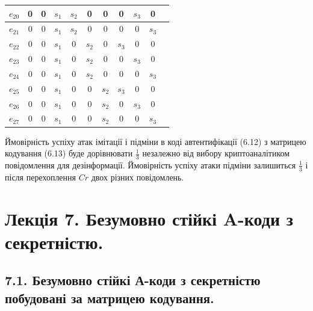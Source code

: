 \begin{example}
\begin{center}
\begin{tabular}{|c|c|c|c|c|c|c|c|c|c|c|}
            $e_{20}$ & 0 & 0 & $s_1$ & $s_2$ & 0 & 0 & 0 & $s_3$ & 0 \\\hline
            $e_{21}$ & 0 & 0 & $s_1$ & $s_2$ & 0 & 0 & 0 & 0 & $s_3$ \\\hline
            $e_{22}$ & 0 & 0 & $s_1$ & 0 & $s_2$ & 0 & $s_3$ & 0 & 0 \\\hline
            $e_{23}$ & 0 & 0 & $s_1$ & 0 & $s_2$ & 0 & 0 & $s_3$ & 0 \\\hline
            $e_{24}$ & 0 & 0 & $s_1$ & 0 & $s_2$ & 0 & 0 & 0 & $s_3$ \\\hline
            $e_{25}$ & 0 & 0 & $s_1$ & 0 & 0 & $s_2$ & $s_3$ & 0 & 0 \\\hline
            $e_{26}$ & 0 & 0 & $s_1$ & 0 & 0 & $s_2$ & 0 & $s_3$ & 0 \\\hline
            $e_{27}$ & 0 & 0 & $s_1$ & 0 & 0 & $s_2$ & 0 & 0 & $s_3$ \\\hline
        \end{tabular}
    \end{center}
    
    Ймовірність успіху атак імітації і підміни в коді автентифікації (6.12) з
    матрицею кодування (6.13) буде дорівнювати $\frac{1}{3}$ незалежно від вибору
    криптоаналітиком повідомлення для дезінформації.
    Ймовірність успіху атаки підміни залишиться $\frac{1}{3}$ і після перехоплення $Cr$
    двох різних повідомлень.
\end{example}


\section{Лекція 7. Безумовно стійкі A-коди з секретністю.}

\subsection{7.1. Безумовно стійкі А-коди з секретністю побудовані за матрицею кодування.}

